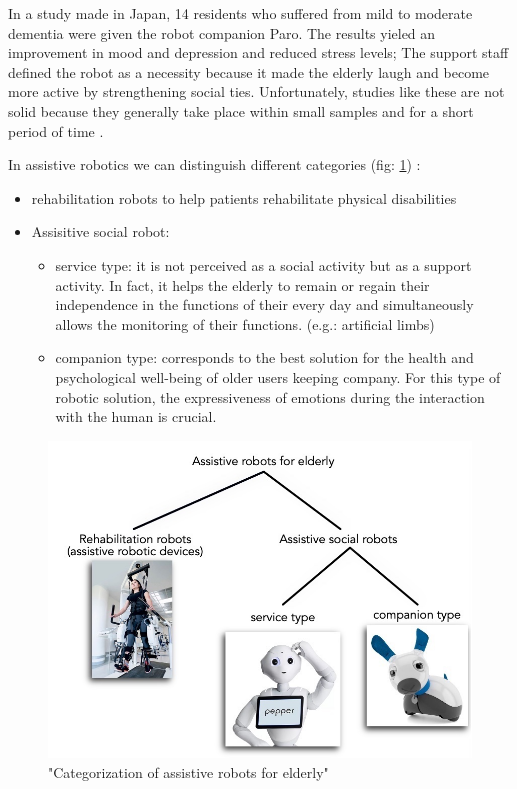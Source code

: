 \documentclass{thesisreport}
\begin{document}
 In a study made in Japan, 14 residents who suffered from mild to moderate dementia were given the robot companion Paro. The results yieled an improvement in mood and depression and reduced stress levels; 
 The support staff defined the robot as a necessity because it made the elderly laugh and become more active by strengthening social ties.
 Unfortunately, studies like these are not solid because they generally take place within small samples and for a short period of time \cite{psicologicalEffects}.
 
 In assistive robotics we can distinguish different categories (fig: \ref{fig:layers}) \cite{assistiveRobots}:
 \begin{itemize}
     \item rehabilitation robots to help patients rehabilitate physical disabilities
     \item  Assisitive social robot:
     \begin{itemize}
         \item service type: it is not perceived as a social activity but as a support activity. In fact, it helps the elderly to remain or regain their independence in the functions of their every day and simultaneously allows the monitoring of their functions. (e.g.: artificial limbs)
         \item companion type: corresponds to the best solution for the health and psychological well-being of older users keeping company. For this type of robotic solution, the expressiveness of emotions during the interaction with the human is crucial.
     \end{itemize}
 \end{itemize}
 
 \begin{figure}[h]
	\centering
	\includegraphics[width=14cm]{Thesis/data/TypeRobot.jpg}
	\caption{"Categorization of assistive robots for elderly" \cite{assistiveRobots}}
	\label{fig:layers}
 \end{figure}
 
\end{document}
